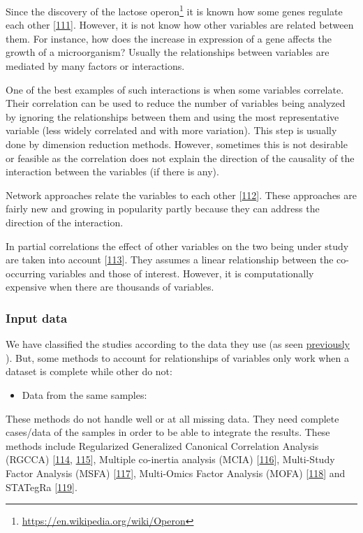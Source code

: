 \documentclass[
  12pt,
  a4paper,
  twoside,
  openright]{book}
\DeclareRobustCommand{\href}[2]{#2\footnote{\url{#1}}}
\providecommand{\tightlist}{%
  \setlength{\itemsep}{0pt}\setlength{\parskip}{0pt}}
\begin{document}
Since the discovery of the lactose \href{https://en.wikipedia.org/wiki/Operon}{operon} it is known how some genes regulate each other {[}\protect\hyperlink{ref-jacob1961}{111}{]}.
However, it is not know how other variables are related between them.
For instance, how does the increase in expression of a gene affects the growth of a microorganism?
Usually the relationships between variables are mediated by many factors or interactions.

One of the best examples of such interactions is when some variables correlate.
Their correlation can be used to reduce the number of variables being analyzed by ignoring the relationships between them and using the most representative variable (less widely correlated and with more variation).
This step is usually done by dimension reduction methods.
However, sometimes this is not desirable or feasible as the correlation does not explain the direction of the causality of the interaction between the variables (if there is any).

Network approaches relate the variables to each other {[}\protect\hyperlink{ref-koh_iomicspass_2019}{112}{]}.
These approaches are fairly new and growing in popularity partly because they can address the direction of the interaction.

In partial correlations the effect of other variables on the two being under study are taken into account {[}\protect\hyperlink{ref-yule1907}{113}{]}.
They assumes a linear relationship between the co-occurring variables and those of interest.
However, it is computationally expensive when there are thousands of variables.

\hypertarget{input-data}{%
\subsubsection{Input data}\label{input-data}}

We have classified the studies according to the data they use (as seen \protect\hyperlink{data-origin}{previously} ).
But, some methods to account for relationships of variables only work when a dataset is complete while other do not:

\begin{itemize}
\tightlist
\item
  Data from the same samples:
\end{itemize}

These methods do not handle well or at all missing data.
They need complete cases/data of the samples in order to be able to integrate the results.
These methods include Regularized Generalized Canonical Correlation Analysis (RGCCA) {[}\protect\hyperlink{ref-tenenhaus_regularized_2011}{114}, \protect\hyperlink{ref-tenenhaus_variable_2014}{115}{]}, Multiple co-inertia analysis (MCIA) {[}\protect\hyperlink{ref-culhane_cross-platform_2003}{116}{]}, Multi-Study Factor Analysis (MSFA) {[}\protect\hyperlink{ref-vito_multi-study_2019}{117}{]}, Multi-Omics Factor Analysis (MOFA) {[}\protect\hyperlink{ref-argelaguet_multi-omics_2018}{118}{]} and STATegRa {[}\protect\hyperlink{ref-gomez-cabreroSTATegraComprehensiveMultiomics2019}{119}{]}.
\end{document}

